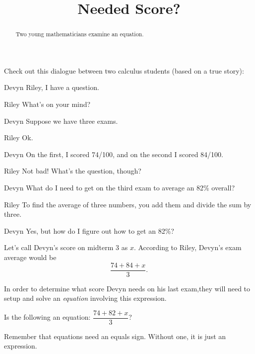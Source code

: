 \documentclass{ximera}
\title[Break-Ground:]{Needed Score?}
\begin{document}
\begin{abstract}
  Two young mathematicians examine an equation.
\end{abstract}
\maketitle

Check out this dialogue between two calculus students (based on a true
story):

\begin{dialogue}
	\item[Devyn] Riley, I have a question.
	\item[Riley] What's on your mind?
	\item[Devyn] Suppose we have three exams.  
	\item[Riley]  Ok. 
	\item[Devyn] On the first, I scored 74/100, and on the second I scored 84/100.
	\item[Riley] Not bad!  What's the question, though?
	\item[Devyn] What do I need to get on the third exam to average an 82\% overall?
	\item[Riley] To find the average of three numbers, you add them and divide the sum by three.
	\item[Devyn] Yes, but how do I figure out how to get an 82\%?
\end{dialogue}

Let's call Devyn's score on midterm 3 as $x$.  According to Riley, Devyn's exam average
would be \[ \frac{74 + 84 + x}{3}. \]

In order to determine what score Devyn needs on his last exam,they will need to setup and solve an \emph{equation} involving this expression.


\begin{problem}
  Is the following an equation: $\displaystyle \dfrac{74 + 82 + x}{3}$?

  \begin{multipleChoice}
  \end{multipleChoice}

  \begin{feedback}
  Remember that equations need an equals sign.  Without one, it is just an expression.  
  \end{feedback}
\end{problem}



\end{document}
